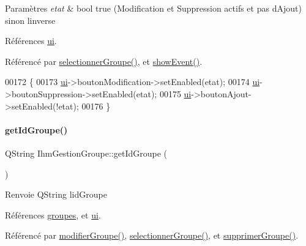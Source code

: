\begin{DoxyParams}{Paramètres}
{\em etat} & bool true (Modification et Suppression actifs et pas d\textquotesingle{}Ajout) sinon l\textquotesingle{}inverse \\
\hline
\end{DoxyParams}


Références \hyperlink{class_ihm_gestion_groupe_a9785ad3dadc1d2cad8558ca8b682dffd}{ui}.



Référencé par \hyperlink{class_ihm_gestion_groupe_a322f2c8584ae8e5be7f2075b73905beb}{selectionner\+Groupe()}, et \hyperlink{class_ihm_gestion_groupe_a813459240b9382aaa1f88593bcdea41b}{show\+Event()}.


\begin{DoxyCode}
00172 \{
00173     \hyperlink{class_ihm_gestion_groupe_a9785ad3dadc1d2cad8558ca8b682dffd}{ui}->boutonModification->setEnabled(etat);
00174     \hyperlink{class_ihm_gestion_groupe_a9785ad3dadc1d2cad8558ca8b682dffd}{ui}->boutonSuppression->setEnabled(etat);
00175     \hyperlink{class_ihm_gestion_groupe_a9785ad3dadc1d2cad8558ca8b682dffd}{ui}->boutonAjout->setEnabled(!etat);
00176 \}
\end{DoxyCode}
\mbox{\label{class_ihm_gestion_groupe_a0f6dd8f645a5bf789521a25322004146}} 
\paragraph{\texorpdfstring{get\+Id\+Groupe()}{getIdGroupe()}}
{\footnotesize\ttfamily Q\+String Ihm\+Gestion\+Groupe\+::get\+Id\+Groupe (\begin{DoxyParamCaption}{ }\end{DoxyParamCaption})\hspace{0.3cm}{\ttfamily [private]}}

\begin{DoxyReturn}{Renvoie}
Q\+String l\textquotesingle{}id\+Groupe 
\end{DoxyReturn}


Références \hyperlink{class_ihm_gestion_groupe_af2d05c88db3e19452e70727446635bc4}{groupes}, et \hyperlink{class_ihm_gestion_groupe_a9785ad3dadc1d2cad8558ca8b682dffd}{ui}.



Référencé par \hyperlink{class_ihm_gestion_groupe_a810c186bf38dab776c7167c85671b268}{modifier\+Groupe()}, \hyperlink{class_ihm_gestion_groupe_a322f2c8584ae8e5be7f2075b73905beb}{selectionner\+Groupe()}, et \hyperlink{class_ihm_gestion_groupe_a08bdd132a37ac574b15d00e4dc959d7f}{supprimer\+Groupe()}.


